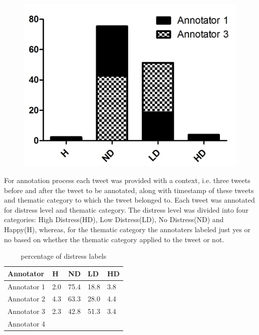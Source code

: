 \documentclass[11pt]{article}
\begin{document}
\begin{figure}
\centering
\includegraphics[scale=0.7]{ChrisMegan4Cat.jpg}
\end{figure}

For annotation process each tweet was provided with a context, i.e. three tweets before and after the tweet to be annotated, along with timestamp of these tweets and thematic category to which the tweet belonged to. Each tweet was annotated for distress level and thematic category. The distress level was divided into four categories: High Distress(HD), Low Distress(LD), No Distress(ND) and Happy(H), whereas, for the thematic category the annotaters labeled just yes or no based on whether the thematic category applied to the tweet or not.

\begin{table}
    \centering
    \begin{tabular}{|l|l|l|l|l|}
    \hline
    Annotator    & H   & ND   & LD   & HD  \\ \hline
    Annotator 1  & 2.0 & 75.4 & 18.8 & 3.8 \\ \hline
    Annotator 2  & 4.3 & 63.3 & 28.0 & 4.4 \\ \hline
    Annotator 3  & 2.3 & 42.8 & 51.3 & 3.4 \\ \hline
    Annotator 4  & ~   & ~    & ~    & ~   \\ \hline
    \end{tabular}
    \caption {percentage of distress labels }

\label{tab:percentage}
\end{table}
\end{document}
